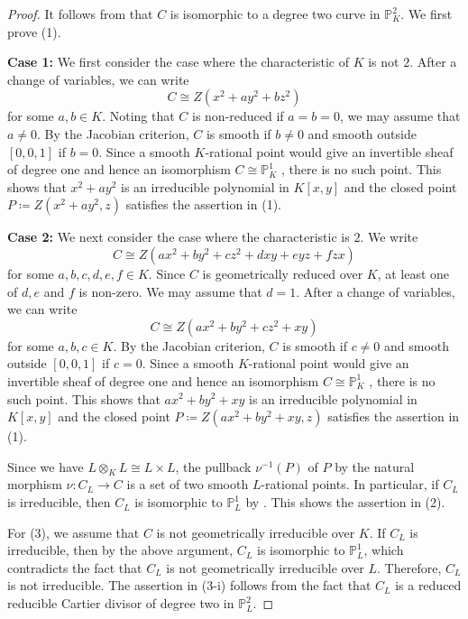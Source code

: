 \documentclass[12pt]{amsart}
\newcommand{\PP}{\mathbb{P}}
\theoremstyle{plain}
\theoremstyle{definition}
\theoremstyle{remark}
\newtheorem{defn and notation}[thm]{Definition and Notation}
\theoremstyle{plain}
\numberwithin{equation}{thm}
\begin{document}
\begin{proof}
    It follows from \cite[Lemma 10.6]{Kol13} that $C$ is isomorphic to a degree two curve in $\PP^2_{K}$.
    We first prove (1).
    
    \textbf{Case 1:}
    We first consider the case where the characteristic of $K$ is not $2$.
    After a change of variables, we can write
    \[
    C \cong Z(x^2+ay^2+bz^2)
    \]
    for some $a,b \in K$.
    Noting that $C$ is non-reduced if $a=b=0$, we may assume that $a \neq 0$.
    By the Jacobian criterion, $C$ is smooth if $b \neq 0$ and smooth outside $[0,0,1]$ if $b=0$.
    Since a smooth $K$-rational point would give an invertible sheaf of degree one and hence an isomorphism $C\cong\PP^1_K$ \cite[Lemma 10.6]{Kol13}, there is no such point.
    This shows that $x^2+ay^2$ is an irreducible polynomial in $K[x,y]$ and the closed point $P \coloneqq Z(x^2+ay^2, z)$ satisfies the assertion in (1).

    \textbf{Case 2:}
    We next consider the case where the characteristic is $2$.
    We write 
    \[
    C \cong Z(ax^2+by^2+cz^2+dxy+eyz+fzx)
    \]
    for some $a,b,c,d,e,f \in K$.
    Since $C$ is geometrically reduced over $K$, at least one of $d,e$ and $f$ is non-zero.
    We may assume that $d=1$.
    After a change of variables, we can write
    \[
    C \cong Z(ax^2+by^2+cz^2+xy)
    \]
    for some $a,b,c \in K$.
    By the Jacobian criterion, $C$ is smooth if $c \neq 0$ and smooth outside $[0,0,1]$ if $c=0$.
    Since a smooth $K$-rational point would give an invertible sheaf of degree one and hence an isomorphism $C\cong\PP^1_K$ \cite[Lemma 10.6]{Kol13}, there is no such point.
    This shows that $ax^2+by^2+xy$ is an irreducible polynomial in $K[x,y]$ and the closed point $P \coloneqq Z(ax^2+by^2+xy, z)$ satisfies the assertion in (1).

    Since we have $L \otimes_K L \cong L \times L$, the pullback $\nu^{-1}(P)$ of $P$ by the natural morphism $\nu : C_L \to C$ is a set of two smooth $L$-rational points.
    In particular, if $C_L$ is irreducible, then $C_L$ is isomorphic to $\PP^1_L$ by \cite[Lemma 10.6]{Kol13}.
    This shows the assertion in (2).
    
    For (3), we assume that $C$ is not geometrically irreducible over $K$. 
    If $C_L$ is irreducible, then by the above argument, $C_L$ is isomorphic to $\PP^1_L$, which contradicts the fact that $C_L$ is not geometrically irreducible over $L$.
    Therefore, $C_L$ is not irreducible.
    The assertion in (3-i) follows from the fact that $C_L$ is a reduced reducible Cartier divisor of degree two in $\PP^2_L$.


\end{proof}
\end{document}
